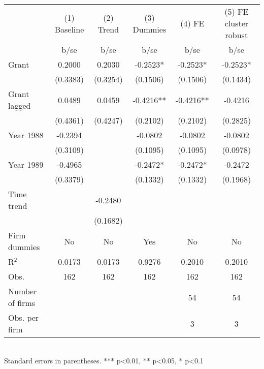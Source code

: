\begin{tabular}{lccccc}\hline
                    &(1) Baseline   &   (2) Trend   & (3) Dummies   &      (4) FE   &(5) FE cluster robust   \\
                    &        b/se   &        b/se   &        b/se   &        b/se   &        b/se   \\
\hline
Grant               &      0.2000   &      0.2030   &     -0.2523*  &     -0.2523*  &     -0.2523*  \\
                    &    (0.3383)   &    (0.3254)   &    (0.1506)   &    (0.1506)   &    (0.1434)   \\
Grant lagged        &      0.0489   &      0.0459   &     -0.4216** &     -0.4216** &     -0.4216   \\
                    &    (0.4361)   &    (0.4247)   &    (0.2102)   &    (0.2102)   &    (0.2825)   \\
Year 1988           &     -0.2394   &               &     -0.0802   &     -0.0802   &     -0.0802   \\
                    &    (0.3109)   &               &    (0.1095)   &    (0.1095)   &    (0.0978)   \\
Year 1989           &     -0.4965   &               &     -0.2472*  &     -0.2472*  &     -0.2472   \\
                    &    (0.3379)   &               &    (0.1332)   &    (0.1332)   &    (0.1968)   \\
Time trend          &               &     -0.2480   &               &               &               \\
                    &               &    (0.1682)   &               &               &               \\
Firm dummies        &          No   &          No   &         Yes   &          No   &          No   \\
\hline
R$^2$               &      0.0173   &      0.0173   &      0.9276   &      0.2010   &      0.2010   \\
Obs.                &         162   &         162   &         162   &         162   &         162   \\
Number of firms     &               &               &               &          54   &          54   \\
Obs. per firm       &               &               &               &           3   &           3   \\
\hline\end{tabular}\\Standard errors in parentheses. *** p<0.01, ** p<0.05, * p<0.1

